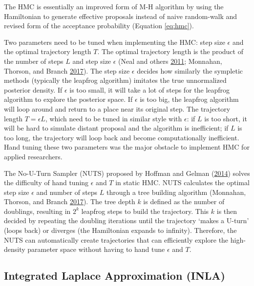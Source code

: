 \documentclass[12pt]{book}
\numberwithin{equation}{chapter}
\begin{document}
The HMC is essentially an improved form of M-H algorithm by using the Hamiltonian to generate effective proposals instead of naive random-walk and revised form of the acceptance probability (Equation \eqref{eq:hmc}).

Two parameters need to be tuned when implementing the HMC: step size \(\epsilon\) and the optimal trajectory length \(T\). The optimal trajectory length is the product of the number of steps \(L\) and step size \(\epsilon\) (Neal and others \protect\hyperlink{ref-neal2011mcmc}{2011}; Monnahan, Thorson, and Branch \protect\hyperlink{ref-monnahan2017faster}{2017}). The step size \(\epsilon\) decides how similarly the sympletic methods (typically the leapfrog algorithm) imitates the true unnormalized posterior density. If \(\epsilon\) is too small, it will take a lot of steps for the leapfrog algorithm to explore the posterior space. If \(\epsilon\) is too big, the leapfrog algorithm will loop around and return to a place near its original step. The trajectory length \(T = \epsilon L\), which need to be tuned in similar style with \(\epsilon\): if \(L\) is too short, it will be hard to simulate distant proposal and the algorithm is inefficient; if \(L\) is too long, the trajectory will loop back and become computationally inefficient. Hand tuning these two parameters was the major obstacle to implement HMC for applied researchers.

The No-U-Turn Sampler (NUTS) proposed by Hoffman and Gelman (\protect\hyperlink{ref-hoffman2014no}{2014}) solves the difficulty of hand tuning \(\epsilon\) and \(T\) in static HMC. NUTS calculates the optimal step size \(\epsilon\) and number of steps \(L\) through a tree building algorithm (Monnahan, Thorson, and Branch \protect\hyperlink{ref-monnahan2017faster}{2017}). The tree depth \(k\) is defined as the number of doublings, resulting in \(2^k\) leapfrog steps to build the trajectory. This \(k\) is then decided by repeating the doubling iterations until the trajectory `makes a U-turn' (loops back) or diverges (the Hamiltonian expands to infinity). Therefore, the NUTS can automatically create trajectories that can efficiently explore the high-density parameter space without having to hand tune \(\epsilon\) and \(T\).

\hypertarget{integrated-laplace-approximation-inla}{%
\subsection{Integrated Laplace Approximation (INLA)}\label{integrated-laplace-approximation-inla}}
\end{document}
